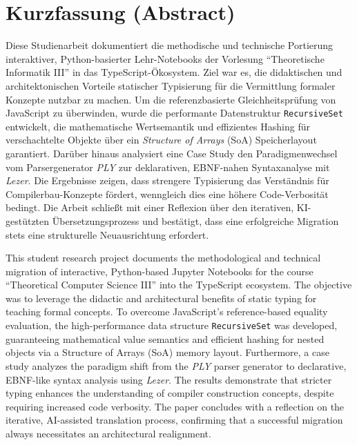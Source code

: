 
\section*{Kurzfassung (Abstract)}

Diese Studienarbeit dokumentiert die methodische und technische Portierung interaktiver, Python-basierter Lehr-Notebooks der Vorlesung \enquote{Theoretische Informatik III} in das TypeScript-Ökosystem. Ziel war es, die didaktischen und architektonischen Vorteile statischer Typisierung für die Vermittlung formaler Konzepte nutzbar zu machen. Um die referenzbasierte Gleichheitsprüfung von JavaScript zu überwinden, wurde die performante Datenstruktur \texttt{RecursiveSet} entwickelt, die mathematische Wertsemantik und effizientes Hashing für verschachtelte Objekte über ein \textit{Structure of Arrays} (SoA) Speicherlayout garantiert. Darüber hinaus analysiert eine Case Study den Paradigmenwechsel vom Parsergenerator \emph{PLY} zur deklarativen, EBNF-nahen Syntaxanalyse mit \emph{Lezer}. Die Ergebnisse zeigen, dass strengere Typisierung das Verständnis für Compilerbau-Konzepte fördert, wenngleich dies eine höhere Code-Verbosität bedingt. Die Arbeit schließt mit einer Reflexion über den iterativen, KI-gestützten Übersetzungsprozess und bestätigt, dass eine erfolgreiche Migration stets eine strukturelle Neuausrichtung erfordert.

\vspace{1em} %

\noindent This student research project documents the methodological and technical migration of interactive, Python-based Jupyter Notebooks for the course \enquote{Theoretical Computer Science III} into the TypeScript ecosystem. The objective was to leverage the didactic and architectural benefits of static typing for teaching formal concepts. To overcome JavaScript's reference-based equality evaluation, the high-performance data structure \texttt{RecursiveSet} was developed, guaranteeing mathematical value semantics and efficient hashing for nested objects via a Structure of Arrays (SoA) memory layout. Furthermore, a case study analyzes the paradigm shift from the \emph{PLY} parser generator to declarative, EBNF-like syntax analysis using \emph{Lezer}. The results demonstrate that stricter typing enhances the understanding of compiler construction concepts, despite requiring increased code verbosity. The paper concludes with a reflection on the iterative, AI-assisted translation process, confirming that a successful migration always necessitates an architectural realignment.